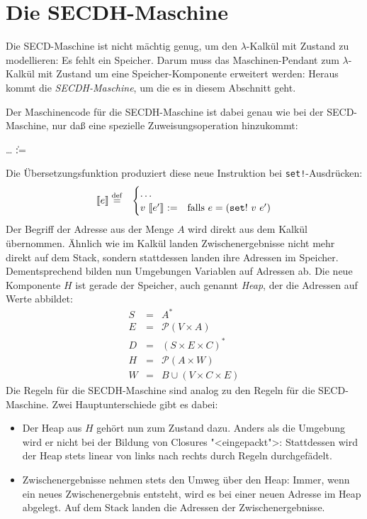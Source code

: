 \section{Die SECDH-Maschine}

Die SECD-Maschine ist nicht mächtig genug, um den $\lambda$-Kalkül mit
Zustand zu modellieren: Es fehlt ein Speicher.  Darum muss das
Maschinen-Pendant zum $\lambda$-Kalkül mit Zustand um eine
Speicher-Komponente erweitert werden: Heraus kommt die
\textit{SECDH-Maschine}, um die es in diesem Abschnitt geht.

Der Maschinencode für die SECDH-Maschine ist dabei genau wie bei der
SECD-Maschine, nur daß eine spezielle Zuweisungsoperation hinzukommt:
%
\begin{grammar}
   \: \ldots
  \> \| :=
\end{grammar}
%
Die Übersetzungsfunktion produziert diese neue Instruktion bei
\texttt{set!}-Ausdrücken:
%
\begin{eqnarray*}
  \llbracket e \rrbracket &\stackrel{\rm def}{=}&
  \begin{cases}
    \ldots\\
    v~\llbracket e'\rrbracket~\mathtt{:=}
    & \textrm{falls $e = (\mathtt{set!}~v~e')$}
  \end{cases}
\end{eqnarray*}  
%
Der Begriff der Adresse aus der Menge $A$ wird direkt aus dem Kalkül
übernommen.  Ähnlich wie im Kalkül landen Zwischenergebnisse nicht
mehr direkt auf dem Stack, sondern stattdessen landen ihre Adressen im
Speicher.  Dementsprechend bilden nun Umgebungen Variablen auf
Adressen ab.  Die neue Komponente $H$ ist gerade der Speicher, auch
genannt \textit{Heap}, der die Adressen auf Werte
abbildet:
%
\begin{eqnarray*}
  S &=& A^{\ast}\\
  E &=& \mathcal{P}(V\times A)\\
  D &=& (S\times E\times C)^{\ast}\\
  H &=& \mathcal{P}(A\times W)\\
  W &=& B \cup (V\times C\times E)
\end{eqnarray*}
%
Die Regeln für die SECDH-Maschine sind analog zu den Regeln für die
SECD-Maschine.  Zwei Hauptunterschiede gibt es dabei:
%
\begin{itemize}
\item Der Heap aus $H$ gehört nun zum Zustand dazu.  Anders als die
  Umgebung wird er nicht bei der Bildung von Closures "<eingepackt">:
  Stattdessen wird der Heap stets linear von links nach rechts durch
  Regeln durchgefädelt.
\item Zwischenergebnisse nehmen stets den Umweg über den Heap: Immer,
  wenn ein neues Zwischenergebnis entsteht, wird es bei einer neuen
  Adresse im Heap abgelegt. Auf dem Stack landen die
  Adressen der Zwischenergebnisse.
\end{itemize}

